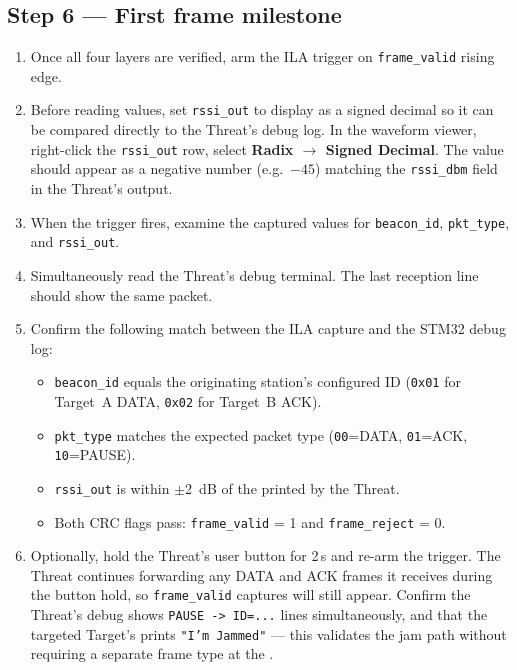 \documentclass[11pt,letterpaper]{article}
\begin{document}
\newpage
\subsection{Step 6 --- First frame milestone}
\begin{enumerate}[leftmargin=2em]
	\item Once all four layers are verified, arm the \mbox{ILA} trigger on \texttt{frame\_valid} rising edge.
	\item Before reading values, set \texttt{rssi\_out} to display as a signed decimal so it can be compared directly to the Threat's debug log. In the waveform viewer, right-click the \texttt{rssi\_out} row, select \textbf{Radix $\to$ Signed Decimal}. The value should appear as a negative number (e.g.\ $-45$) matching the \texttt{rssi\_dbm} field in the Threat's \UART{} output.
	\item When the trigger fires, examine the captured values for \texttt{beacon\_id}, \texttt{pkt\_type}, and \texttt{rssi\_out}.
	\item Simultaneously read the Threat's debug \UART{} terminal. The last reception line should show the same packet.
	\item Confirm the following match between the \mbox{ILA} capture and the STM32 debug log:
	\begin{itemize}[leftmargin=1.2em]
		\item \texttt{beacon\_id} equals the originating station's configured \mbox{ID} (\texttt{0x01} for Target~A DATA, \texttt{0x02} for Target~B ACK).
		\item \texttt{pkt\_type} matches the expected packet type (\texttt{00}=DATA, \texttt{01}=ACK, \texttt{10}=PAUSE).
		\item \texttt{rssi\_out} is within $\pm$2~dB of the \RSSI{} printed by the Threat.
		\item Both CRC flags pass: \texttt{frame\_valid} = 1 and \texttt{frame\_reject} = 0.
	\end{itemize}
	\item Optionally, hold the Threat's user button for 2\,s and re-arm the trigger. The Threat continues forwarding any DATA and ACK frames it receives during the button hold, so \texttt{frame\_valid} captures will still appear. Confirm the Threat's debug \UART{} shows \texttt{PAUSE -> ID=...} lines simultaneously, and that the targeted Target's \UART{} prints \texttt{"I'm Jammed"} --- this validates the jam path without requiring a separate frame type at the \FPGA{}.
\end{enumerate}
\end{document}
